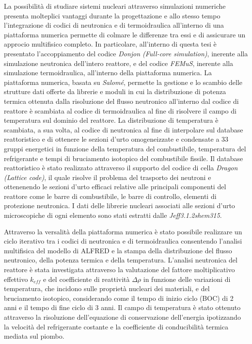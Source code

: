 La possibilità di studiare sistemi nucleari attraverso simulazioni numeriche presenta molteplici vantaggi durante la progettazione e allo stesso tempo l'integrazione di codici di neutronica e di termoidraulica all'interno di una piattaforma numerica permette di colmare le differenze tra essi e di assicurare un approcio multifisico completo.
In particolare, all'interno di questa tesi è presentato l'accoppiamento del codice \textit{Donjon (Full-core simulation)}, inerente alla simulazione neutronica dell'intero reattore, e del codice \textit{FEMuS}, inerente alla simulazione termoidraulica, all'interno della piattaforma numerica.
La piattaforma numerica, basata su \textit{Salom\'e}, permette la gestione e lo scambio delle strutture dati offerte da librerie e moduli in cui la distribuzione di potenza termica ottenuta dalla risoluzione del flusso neutronico all'interno dal codice di reattore è scambiata al codice di termoidraulica al fine di risolvere il campo di temperatura sul dominio del reattore.
La distribuzione di temperatura è scambiata, a sua volta, al codice di neutronica al fine di interpolare sul database reattoristico e di ottenere le sezioni d'urto omogeneizzate e condensate a 33 gruppi energetici in funzione della temperatura del combustibile, temperatura del refrigerante e tempi di bruciamento isotopico del combustibile fissile.
Il database reattoristico è stato realizzato attraverso il supporto del codice di cella \textit{Dragon (Lattice code)}, il quale risolve il problema del trasporto dei neutroni e ottenenendo le sezioni d'urto efficaci relative alle principali componenti del reattore come le barre di combustibile, le barre di controllo, elementi di protezione neutronica. I dati delle librerie nucleari associati alle sezioni d'urto microscopiche di ogni elemento sono stati estratti dalle \textit{Jeff3.1.2shem315}.

Attraverso la versalità della piattaforma numerica è stato possibile realizzare un ciclo iterativo tra i codici di neutronica e di termoidraulica consentendo l'analisi multifisica del modello di ALFRED e la stampa della distribuzione del flusso neutronico, della potenza termica e della temperatura.
L'analisi neutronica del reattore è stata investigata attraverso la valutazione del fattore moltiplicativo effettivo $k_{eff}$ e del coefficiente di reattività $\Delta \rho$ in funzione delle variazioni di temperatura, che incidono sulle proprietà nucleari dei materiali, e del bruciamento isotopico, considerando come il tempo di inizio ciclo (BOC) di 2 anni e il tempo di fine ciclo di 3 anni.
Il campo di temperatura è stato ottenuto attraverso la risoluzione dell'equazione di conservazione dell'energia ipotizzando la velocità del refrigerante costante e la coefficiente di conducibilità termica mediata sul piombo.

